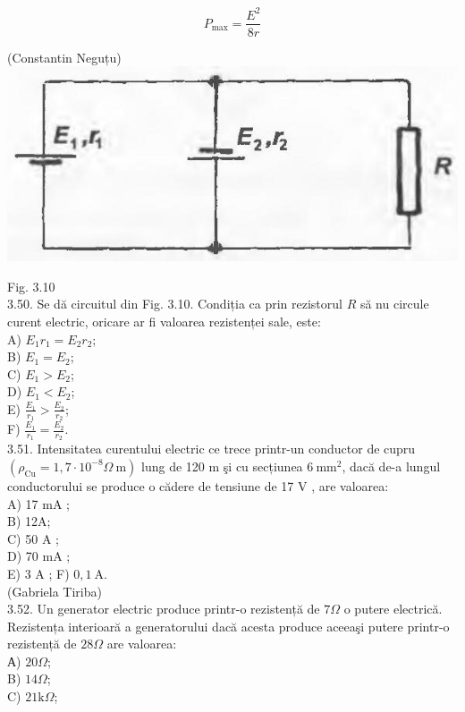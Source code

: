 \documentclass[10pt]{article}
\begin{document}
$$
P_{\max }=\frac{E^{2}}{8 r}
$$

(Constantin Neguțu)\\
\includegraphics[max width=\textwidth, center]{2025_07_01_5b3ff9fa0d508c8e9f17g-154}

Fig. 3.10\\
3.50. Se dă circuitul din Fig. 3.10. Condiția ca prin rezistorul $R$ să nu circule curent electric, oricare ar fi valoarea rezistenței sale, este:\\
A) $E_{1} r_{1}=E_{2} r_{2}$;\\
B) $E_{1}=E_{2}$;\\
C) $E_{1}>E_{2}$;\\
D) $E_{1}<E_{2}$;\\
E) $\frac{E_{1}}{r_{1}}>\frac{E_{2}}{r_{2}}$;\\
F) $\frac{E_{1}}{r_{1}}=\frac{E_{2}}{r_{2}}$.\\
3.51. Intensitatea curentului electric ce trece printr-un conductor de cupru $\left(\rho_{\mathrm{Cu}}=1,7 \cdot 10^{-8} \Omega \mathrm{~m}\right)$ lung de 120 m şi cu secțiunea $6 \mathrm{~mm}^{2}$, dacă de-a lungul conductorului se produce o cădere de tensiune de 17 V , are valoarea:\\
A) 17 mA ;\\
B) 12A;\\
C) 50 A ;\\
D) 70 mA ;\\
E) 3 A ; F) $0,1 \mathrm{~A}$.\\
(Gabriela Tiriba)\\
3.52. Un generator electric produce printr-o rezistență de $7 \Omega$ o putere electrică. Rezistența interioară a generatorului dacă acesta produce aceeaşi putere printr-o rezistență de $28 \Omega$ are valoarea:\\
А) $20 \Omega$;\\
B) $14 \Omega$;\\
C) $21 \mathrm{k} \Omega$;\\
\end{document}
